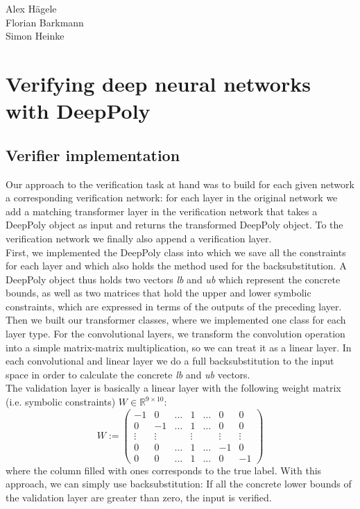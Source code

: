 \documentclass[10pt,a4paper]{article}
\begin{document}
\noindent Alex Hägele\\
Florian Barkmann\\
Simon Heinke\\


\section*{Verifying deep neural networks with DeepPoly}
\subsection*{Verifier implementation}
Our approach to the verification task at hand was to build for each given network a corresponding verification network: for each layer in the original network we add a matching transformer layer in the verification network that takes a DeepPoly object as input and returns the transformed DeepPoly object. To the verification network we finally also append a verification layer.\\
First, we implemented the DeepPoly class into which we save all the constraints for each layer and which also holds the method used for the backsubstitution. A DeepPoly object thus holds two vectors \textit{lb} and \textit{ub} which represent the concrete bounds, as well as two matrices that hold the upper and lower symbolic constraints, which are expressed in terms of the outputs of the preceding layer.\\
Then we built our transformer classes, where we implemented one class for each layer type. For the convolutional layers, we transform the convolution operation into a simple matrix-matrix multiplication, so we can treat it as a linear layer. In each convolutional and linear layer we do a full backsubstitution to the input space in order to calculate the concrete \textit{lb} and \textit{ub} vectors.\\
The validation layer is basically a linear layer with the following weight matrix (i.e. symbolic constraints) $W \in \mathbb{R}^{9 \times 10}$:\\

\[
W := 
\begin{pmatrix}
-1 & 0 & \hdots & 1 &\hdots & 0 & 0\\
0 & -1 & \hdots &1  &\hdots & 0 & 0\\
 \vdots & \vdots &  & \vdots &  & \vdots & \vdots\\
0 & 0 & \hdots & 1 & \hdots & -1 & 0\\
0 & 0 & \hdots & 1 & \hdots & 0 & -1
\end{pmatrix}
\]
where the column filled with ones corresponds to the true label. With this approach, we can simply use backsubstitution: If all the concrete lower bounds of the validation layer are greater than zero, the input is verified.
\end{document}
